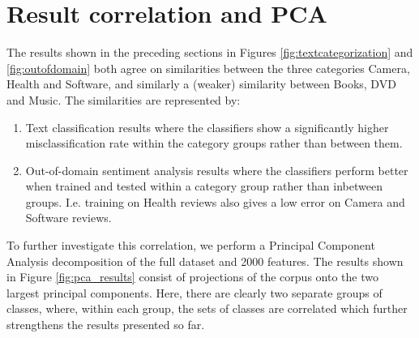\section{Result correlation and PCA}
The results shown in the preceding sections in Figures \ref{fig:textcategorization} and \ref{fig:outofdomain} both agree on similarities between the three categories Camera, Health and Software, and similarly a (weaker) similarity between Books, DVD and Music. The similarities are represented by:
\begin{enumerate}
  \item Text classification results where the classifiers show a significantly higher misclassification rate within the category groups rather than between them.
  \item Out-of-domain sentiment analysis results where the classifiers perform better when trained and tested within a category group rather than inbetween groups. I.e. training on Health reviews also gives a low error on Camera and Software reviews.
\end{enumerate}

To further investigate this correlation, we perform a Principal Component Analysis decomposition of the full dataset and 2000 features. The results shown in Figure \ref{fig:pca_results} consist of projections of the corpus onto the two largest principal components. Here, there are clearly two separate groups of classes, where, within each group, the sets of classes are correlated which further strengthens the results presented so far.



